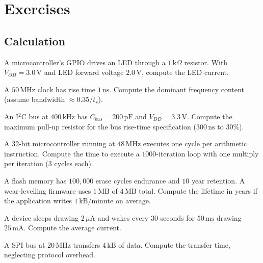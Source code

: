 \section{Exercises}

\subsection*{Calculation}

\begin{exercise}
A microcontroller's GPIO drives an LED through a $1\,\text{k}\Omega$ resistor. With $V_{OH} = 3.0\,\text{V}$ and LED forward voltage $2.0\,\text{V}$, compute the LED current.
\end{exercise}

\begin{exercise}
A $50\,\text{MHz}$ clock has rise time $1\,\text{ns}$. Compute the dominant frequency content (assume bandwidth $\approx 0.35/t_r$).
\end{exercise}

\begin{exercise}
An I$^2$C bus at $400\,\text{kHz}$ has $C_{bus} = 200\,\text{pF}$ and $V_{DD} = 3.3\,\text{V}$. Compute the maximum pull-up resistor for the bus rise-time specification ($300\,\text{ns}$ to $30\%$).
\end{exercise}

\begin{exercise}
A $32$-bit microcontroller running at $48\,\text{MHz}$ executes one cycle per arithmetic instruction. Compute the time to execute a $1000$-iteration loop with one multiply per iteration ($3$ cycles each).
\end{exercise}

\begin{exercise}
A flash memory has $100{,}000$ erase cycles endurance and $10$ year retention. A wear-levelling firmware uses $1\,\text{MB}$ of $4\,\text{MB}$ total. Compute the lifetime in years if the application writes $1\,\text{kB}/\text{minute}$ on average.
\end{exercise}

\begin{exercise}
A device sleeps drawing $2\,\mu\text{A}$ and wakes every $30$ seconds for $50\,\text{ms}$ drawing $25\,\text{mA}$. Compute the average current.
\end{exercise}

\begin{exercise}
A SPI bus at $20\,\text{MHz}$ transfers $4\,\text{kB}$ of data. Compute the transfer time, neglecting protocol overhead.
\end{exercise}

